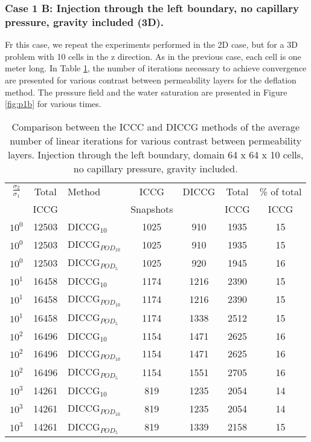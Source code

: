 \documentclass[12pt]{article}
\begin{document}
\subsubsection*{Case 1 B: Injection through the left boundary, no capillary pressure, gravity included (3D).}
Fr this case, we repeat the experiments performed in the 2D case, but for a 3D problem with 10 cells in the z direction. As in the previous case, each cell is one meter long. In Table \ref{table:liter1b}, the number of iterations necessary to achieve convergence are presented for various contrast between permeability layers for the deflation method.  
The pressure field and the water saturation are presented in Figure \ref{fig:p1b} for various times.
\begin{table}[!h]\centering
\begin{minipage}{1\textwidth}
 \centering
\begin{tabular}{ ||c|c||l|c|c|c|c||} 
\hline
$\frac{\sigma_2}{\sigma_1}$&Total&Method  & ICCG&DICCG &Total&\% of total\\ 
                           & ICCG     &  & Snapshots& &ICCG& ICCG\\ 
\hline 
$10^{0}$ &12503& DICCG$_{10}$&1025&910&1935&15\\ 
\hline  
$10^{0}$ &12503& DICCG$_{POD_{10}}$&1025&910&1935&15 \\ 
\hline  
$10^{0}$ &12503& DICCG$_{POD_{5}}$&1025&920&1945&16 \\ 
\hline  
$10^{1}$ &16458& DICCG$_{10}$&1174&1216&2390&15\\ 
\hline  
$10^{1}$ &16458& DICCG$_{POD_{10}}$&1174&1216&2390&15 \\ 
\hline  
$10^{1}$ &16458& DICCG$_{POD_{5}}$&1174&1338&2512&15 \\ 
\hline  
$10^{2}$ &16496& DICCG$_{10}$&1154&1471&2625&16\\ 
\hline  
$10^{2}$ &16496& DICCG$_{POD_{10}}$&1154&1471&2625&16 \\ 
\hline  
$10^{2}$ &16496& DICCG$_{POD_{5}}$&1154&1551&2705&16 \\ 
\hline 
$10^{3}$ &14261& DICCG$_{10}$&819&1235&2054&14\\ 
\hline  
$10^{3}$ &14261& DICCG$_{POD_{10}}$&819&1235&2054&14 \\ 
\hline  
$10^{3}$ &14261& DICCG$_{POD_{5}}$&819&1339&2158&15 \\ 
\hline 
\end{tabular} 
\caption{Comparison between the ICCC and DICCG methods of the average number of linear iterations for various contrast between permeability layers. Injection through the left boundary, domain 64 x 64 x 10 cells, no capillary pressure, gravity  included.}\label{table:liter1b} 
\end{minipage}  
\end{table}  
\end{document}
